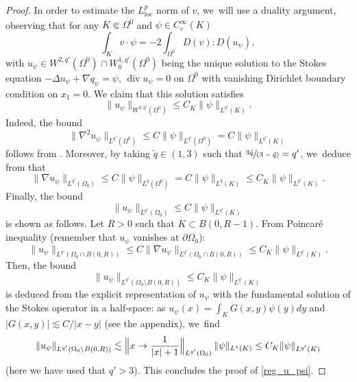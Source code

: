 \documentclass[10pt]{amsart}
\newcommand{\spfrac}[2]{\sfrac{#1}{(#2)}}
\newcommand{\loc}{\mathrm{loc}}
\renewcommand{\div}{\operatorname{div}}
\theoremstyle{plain}
\theoremstyle{definition}
\let\pa\partial
\let\na\nabla
\begin{document}
\begin{proof}
In order to estimate the $L^p_{\loc}$ norm of $v$, we~will use a duality argument, observing that for any $K\Subset \overline{\Omega^0}$ and $\psi \in C^\infty_c(K)$
\[
\int_{K} v \cdot \psi = -2 \int_{\Omega^0} D (v): D (u_\psi),
\]
with $u_\psi \in W^{2,q'}(\Omega^0) \cap W^{1,q'}_0(\Omega^0)$ being the unique solution to the Stokes equation $-\Delta u_\psi+\nabla q_\psi=\psi $, $\div u_\psi=0$ on $\Omega^0$ with vanishing Dirichlet boundary condition on $x_1=0$. We claim that this solution satisfies
\begin{equation}\label{reg_u_psi}
\|u_\psi \|_{W^{2,q'}(\Omega^0)} \leq C_K \|\psi\|_{L^{q'}(K)}.
\end{equation}
Indeed, the bound
\[
\|\na^2 u_\psi\|_{L^{q'}(\Omega^0)} \le C \|\psi\|_{L^{q'}(\Omega^0)} = C \|\psi\|_{L^{q'}(K)}
\]
follows from \cite[Th.\,IV.3.2,\,(IV.3.30)]{Galdi}. Moreover, by taking $\tilde{q} \!\in\! (1,3)$ such that $\spfrac{3 \tilde q}{3-\tilde q} = q'$, we~deduce from \cite[Th.\,IV.3.2,\,(IV.3.31)]{Galdi} that
\[
\|\na u_\psi\|_{L^{q'}(\Omega_0)} \le C \|\psi\|_{L^{\tilde q}(\Omega^0)} = C \|\psi\|_{L^{\tilde q}(K)} \le C_K \|\psi\|_{L^{q'}(K)}.
\]
Finally, the bound
\[
\|u_\psi\|_{L^{q'}(\Omega_0)} \le C \|\psi\|_{L^{q'}(K)}
\]
is shown as follows. Let $R > 0$ such that $K \subset B(0,R-1)$. From Poincaré inequality (remember that $u_\psi$ vanishes at $\pa \Omega_0$):
\[
\|u_\psi\|_{L^{q'}(\Omega_0 \cap B(0,R))} \le C \|\na u_\psi\|_{L^{q'}(\Omega_0 \cap B(0,R))} \le C_K \|\psi\|_{L^{q'}(K)}.
\]
Then, the bound
\[
\|u_\psi\|_{L^{q'}(\Omega_0 \setminus B(0,R))} \le C_K \|\psi\|_{L^{q'}(K)}
\]
is deduced from the explicit representation of $u_\psi$ with the fundamental solution of the Stokes operator in a half-space: as $u_\psi(x) = \int_{K} G(x,y) \psi(y) dy$ and $|G(x,y)| \lesssim C/|x-y|$ (see the appendix), we~find
\[
\|u_\psi\|_{L^{q'}(\Omega_0 \setminus B(0,R))} \lesssim \Bigl\|x \rightarrow \frac{1}{|x|+1}\Bigr\|_{L^{q'}(\Omega_0)}\, \|\psi\|_{L^1(K)} \le C_K \|\psi\|_{L^{q'}(K)}
\]
(here we have used that $q' > 3$). This concludes the proof of \eqref{reg_u_psi}.


\end{proof}
\end{document}
